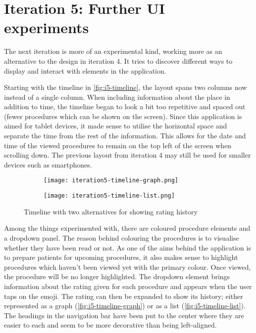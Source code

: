 \section{Iteration 5: Further UI experiments}
\label{sec:iteration5}

The next iteration is more of an experimental kind, working more as an alternative to the design in iteration 4. It tries to discover different ways to display and interact with elements in the application.

Starting with the timeline in \autoref{fig:i5-timeline}, the layout spans two columns now instead of a single column. When including information about the place in addition to time, the timeline began to look a bit too repetitive and spaced out (fewer procedures which can be shown on the screen). Since this application is aimed for tablet devices, it made sense to utilise the horizontal space and separate the time from the rest of the information. This allows for the date and time of the viewed procedures to remain on the top left of the screen when scrolling down. The previous layout from iteration 4 may still be used for smaller devices such as smartphones.

\begin{sidewaysfigure}
    \centering
    \hspace{\fill}
    \begin{subfigure}{0.4\textwidth}
        \centering
        \texttt{[image: iteration5-timeline-graph.png]}
        \label{fig:i5-timeline-graph}
    \end{subfigure}
    \hspace{\fill}
    \begin{subfigure}{0.4\textwidth}
        \centering
        \texttt{[image: iteration5-timeline-list.png]}
        \label{fig:i5-timeline-list}
    \end{subfigure}
    \hspace*{\fill}
    \caption{Timeline with two alternatives for showing rating history}
    \label{fig:i5-timeline}
\end{sidewaysfigure}

Among the things experimented with, there are coloured procedure elements and a dropdown panel. The reason behind colouring the procedures is to visualise whether they have been read or not. As one of the aims behind the application is to prepare patients for upcoming procedures, it also makes sense to highlight procedures which haven't been viewed yet with the primary colour. Once viewed, the procedure will be no longer highlighted. The dropdown element brings information about the rating given for each procedure and appears when the user taps on the emoji. The rating can then be expanded to show its history; either represented as a graph (\autoref{fig:i5-timeline-graph}) or as a list (\autoref{fig:i5-timeline-list}). The headings in the navigation bar have been put to the center where they are easier to each and seem to be more decorative than being left-aligned.

